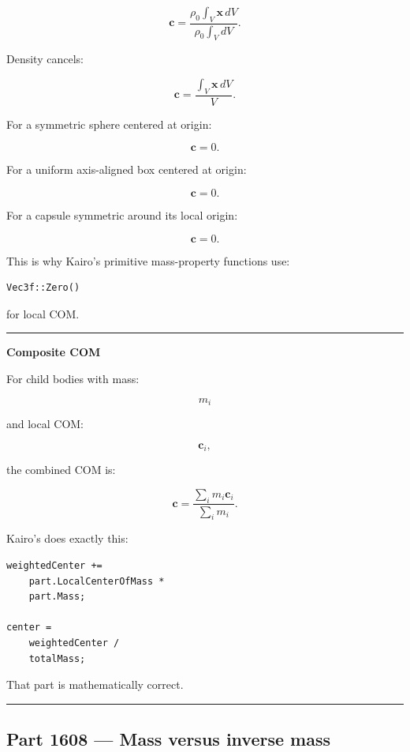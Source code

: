 \[
\mathbf{c}
=
\frac{
\rho_0\int_V\mathbf{x}\,dV
}{
\rho_0\int_VdV
}.
\]

Density cancels:

\[
\mathbf{c}
=
\frac{
\int_V\mathbf{x}\,dV
}{
V
}.
\]

For a symmetric sphere centered at origin:

\[
\mathbf{c}=0.
\]

For a uniform axis-aligned box centered at origin:

\[
\mathbf{c}=0.
\]

For a capsule symmetric around its local origin:

\[
\mathbf{c}=0.
\]

This is why Kairo's primitive mass-property functions use:

\begin{verbatim}
Vec3f::Zero()
\end{verbatim}

for local COM.

\begin{center}\rule{0.5\linewidth}{0.5pt}\end{center}

\textbf{Composite COM}

For child bodies with mass:

\[
m_i
\]

and local COM:

\[
\mathbf{c}_i,
\]

the combined COM is:

\[
\boxed{
\mathbf{c}
=
\frac{
\sum_i m_i\mathbf{c}_i
}{
\sum_i m_i
}.
}
\]

Kairo's  does exactly this:

\begin{verbatim}
weightedCenter +=
    part.LocalCenterOfMass *
    part.Mass;

center =
    weightedCenter /
    totalMass;
\end{verbatim}

That part is mathematically correct.

\begin{center}\rule{0.5\linewidth}{0.5pt}\end{center}

\subsection{Part 1608 --- Mass versus inverse mass}\label{06-engine-ii-ch034-part-1608-mass-versus-inverse-mass}

